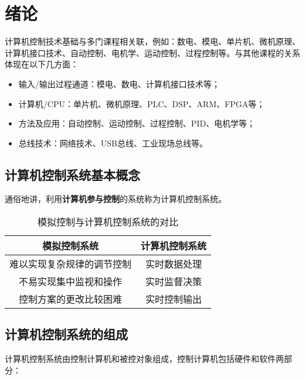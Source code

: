 \chapter{绪论}



计算机控制技术基础与多门课程相关联，例如：数电、模电、单片机、微机原理、计算机接口技术、自动控制、电机学、运动控制、过程控制等。与其他课程的关系体现在以下几方面：

\begin{itemize}
  \item
输入/输出过程通道：模电、数电、计算机接口技术等；
  \item
计算机/CPU：单片机、微机原理、PLC、DSP、ARM、FPGA等；
  \item
方法及应用：自动控制、运动控制、过程控制、PID、电机学等；
  \item
总线技术：网络技术、USB总线、工业现场总线等。
\end{itemize}




\section{计算机控制系统基本概念}




通俗地讲，利用\textbf{计算机参与控制}的系统称为计算机控制系统。


\begin{table}[h]
  \centering
\begin{tabular}{|c|c|}
  \hline
  模拟控制系统 & 计算机控制系统 \\ \hline
  难以实现复杂规律的调节控制 & 实时数据处理 \\
  不易实现集中监视和操作 & 实时监督决策 \\
  控制方案的更改比较困难 & 实时控制输出 \\
  \hline
\end{tabular}
  \caption{模拟控制与计算机控制系统的对比}\label{tab:1.1}
\end{table}








\section{计算机控制系统的组成}

计算机控制系统由控制计算机和被控对象组成，控制计算机包括硬件和软件两部分：


